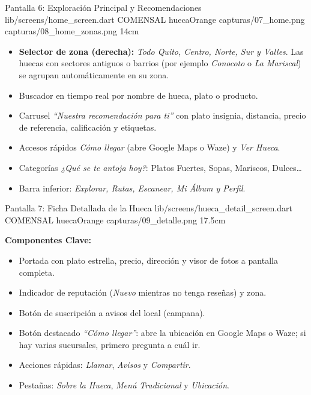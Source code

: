 \pantalladoble
  {Pantalla 6: Exploración Principal y Recomendaciones}
  {lib/screens/home_screen.dart}
  {COMENSAL}
  {huecaOrange}
  {capturas/07_home.png}
  {capturas/08_home_zonas.png}
  {14cm}
  {
    \begin{itemize}[leftmargin=*, itemsep=2pt]
      \item \textbf{Selector de zona (derecha):} \textit{Todo Quito, Centro, Norte, Sur y Valles}. Las huecas con sectores antiguos o barrios (por ejemplo \textit{Conocoto} o \textit{La Mariscal}) se agrupan automáticamente en su zona.
      \item Buscador en tiempo real por nombre de hueca, plato o producto.
      \item Carrusel \textit{``Nuestra recomendación para ti''} con plato insignia, distancia, precio de referencia, calificación y etiquetas.
      \item Accesos rápidos \textit{Cómo llegar} (abre Google Maps o Waze) y \textit{Ver Hueca}.
      \item Categorías \textit{¿Qué se te antoja hoy?}: Platos Fuertes, Sopas, Mariscos, Dulces\dots
      \item Barra inferior: \textit{Explorar, Rutas, Escanear, Mi Álbum y Perfil}.
    \end{itemize}
  }

\pantallashowcase
  {Pantalla 7: Ficha Detallada de la Hueca}
  {lib/screens/hueca_detail_screen.dart}
  {COMENSAL}
  {huecaOrange}
  {capturas/09_detalle.png}
  {17.5cm}
  {

    \textbf{Componentes Clave:}
    \begin{itemize}[leftmargin=*, itemsep=2pt]
      \item Portada con plato estrella, precio, dirección y visor de fotos a pantalla completa.
      \item Indicador de reputación (\textit{Nuevo} mientras no tenga reseñas) y zona.
      \item Botón de suscripción a avisos del local (campana).
      \item Botón destacado \textit{``Cómo llegar''}: abre la ubicación en Google Maps o Waze; si hay varias sucursales, primero pregunta a cuál ir.
      \item Acciones rápidas: \textit{Llamar}, \textit{Avisos} y \textit{Compartir}.
      \item Pestañas: \textit{Sobre la Hueca}, \textit{Menú Tradicional} y \textit{Ubicación}.
    \end{itemize}
  }

